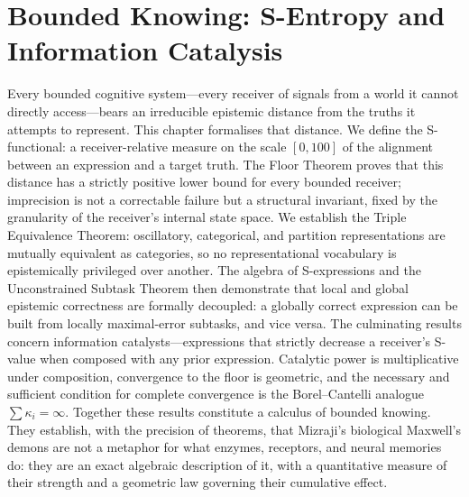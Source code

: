 
\providecommand{\receiver}{\mathcal{R}}
\providecommand{\Sfloor}{S_{\flat}}
\providecommand{\catpow}{\kappa}
\providecommand{\Exprs}{\mathbf{Expr}}
\providecommand{\Cands}{\mathcal{X}}
\providecommand{\TruthSp}{\mathcal{T}}
\providecommand{\OscRep}{\mathfrak{O}}
\providecommand{\CatRep}{\mathfrak{C}}
\providecommand{\PartRep}{\mathfrak{P}}
\providecommand{\seval}{\mathrm{eval}}
\providecommand{\iCat}{\mathrm{iCat}}
\providecommand{\ReceiverSet}{\mathfrak{R}}

\chapter{Bounded Knowing: S-Entropy and Information Catalysis}
\label{ch:s-entropy}


\begin{chapterabstract}
Every bounded cognitive system---every receiver of signals from a world it cannot directly access---bears an irreducible epistemic distance from the truths it attempts to represent. This chapter formalises that distance. We define the S-functional: a receiver-relative measure on the scale $[0, 100]$ of the alignment between an expression and a target truth. The Floor Theorem proves that this distance has a strictly positive lower bound for every bounded receiver; imprecision is not a correctable failure but a structural invariant, fixed by the granularity of the receiver's internal state space. We establish the Triple Equivalence Theorem: oscillatory, categorical, and partition representations are mutually equivalent as categories, so no representational vocabulary is epistemically privileged over another. The algebra of S-expressions and the Unconstrained Subtask Theorem then demonstrate that local and global epistemic correctness are formally decoupled: a globally correct expression can be built from locally maximal-error subtasks, and vice versa. The culminating results concern information catalysts---expressions that strictly decrease a receiver's S-value when composed with any prior expression. Catalytic power is multiplicative under composition, convergence to the floor is geometric, and the necessary and sufficient condition for complete convergence is the Borel--Cantelli analogue $\sum \catpow_i = \infty$. Together these results constitute a calculus of bounded knowing. They establish, with the precision of theorems, that Mizraji's biological Maxwell's demons are not a metaphor for what enzymes, receptors, and neural memories do: they are an exact algebraic description of it, with a quantitative measure of their strength and a geometric law governing their cumulative effect.
\end{chapterabstract}

